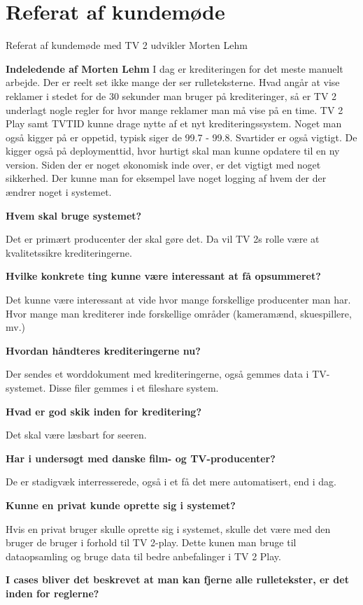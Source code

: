 \section{Referat af kundemøde}
\label{kundemøde}
Referat af kundemøde med TV 2 udvikler Morten Lehm 

\textbf{Indeledende af Morten Lehm}
I dag er krediteringen for det meste manuelt arbejde. Der er reelt set ikke mange der ser rulleteksterne. Hvad angår at vise reklamer i stedet for de 30 sekunder man bruger på krediteringer, så er TV 2 underlagt nogle regler for hvor mange reklamer man må vise på en time. TV 2 Play samt TVTID kunne drage nytte af et nyt krediteringssystem. Noget man også kigger på er oppetid, typisk siger de 99.7 - 99.8. Svartider er også vigtigt. De kigger også på deploymenttid, hvor hurtigt skal man kunne opdatere til en ny version. Siden der er noget økonomisk inde over, er det vigtigt med noget sikkerhed. Der kunne man for eksempel lave noget logging af hvem der der ændrer noget i systemet.

\textbf{Hvem skal bruge systemet?}

Det er primært producenter der skal gøre det. Da vil TV 2s rolle være at kvalitetssikre krediteringerne.

\textbf{Hvilke konkrete ting kunne være interessant at få opsummeret?}

Det kunne være interessant at vide hvor mange forskellige producenter man har. Hvor mange man krediterer inde forskellige områder (kameramænd, skuespillere, mv.)

\textbf{Hvordan håndteres krediteringerne nu?}

Der sendes et worddokument med krediteringerne, også gemmes data i TV-systemet. Disse filer gemmes i et fileshare system.

\textbf{Hvad er god skik inden for kreditering?}

Det skal være læsbart for seeren.

\textbf{Har i undersøgt med danske film- og TV-producenter?}

De er stadigvæk interresserede, også i et få det mere automatisert, end i dag.

\textbf{Kunne en privat kunde oprette sig i systemet?}

Hvis en privat bruger skulle oprette sig i systemet, skulle det være med den bruger de bruger i forhold til TV 2-play. Dette kunen man bruge til dataopsamling og bruge data til bedre anbefalinger i TV 2 Play.

\textbf{I cases bliver det beskrevet at man kan fjerne alle rulletekster, er det inden for reglerne?}

